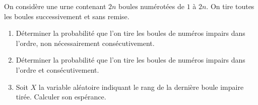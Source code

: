\begin{enonce}
\begin{exercise}[ID={RMS127 E764},subtitle={Mines-Ponts PSI 2016},tags={}]
On considère une urne contenant $2n$ boules numérotées de $1$ à $2n$.
On tire toutes les boules successivement et sans remise.
\begin{enumerate}
  \item 
    Déterminer la probabilité que l'on tire les boules de numéros impairs dans l'ordre, non nécessairement consécutivement.

  \item 
    Déterminer la probabilité que l'on tire les boules de numéros impairs dans l'ordre et consécutivement.

  \item
    Soit $X$ la variable aléatoire indiquant le rang de la dernière boule impaire tirée.
    Calculer son espérance.  
\end{enumerate}
\end{exercise}
\begin{solution}
\end{solution}
\end{enonce}
